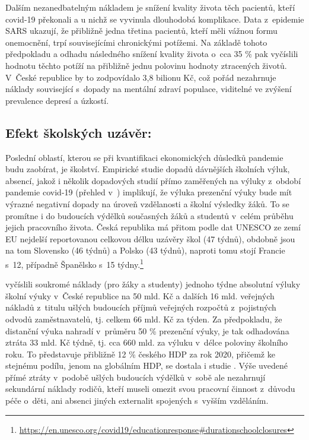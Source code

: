 Dalším nezanedbatelným nákladem je snížení kvality života těch pacientů, kteří covid-19 překonali a u nichž se vyvinula dlouhodobá komplikace. Data z~epidemie SARS ukazují, že přibližně jedna třetina pacientů, kteří měli vážnou formu onemocnění, trpí souvisejícími chronickými potížemi. Na základě tohoto předpokladu a odhadu následného snížení kvality života o~cca 35 \% pak \cite{Cutler2020} vyčíslili hodnotu těchto potíží na přibližně jednu polovinu hodnoty ztracených životů. V~České republice by to zodpovídalo 3,8 bilionu Kč, což pořád nezahrnuje náklady související s~dopady na mentální zdraví populace, viditelné ve zvýšení prevalence depresí a úzkostí.

\subsection*{Efekt \v{s}kolsk\'{y}ch uz\'{a}v\v{e}r:} 

Poslední oblastí, kterou se při kvantifikaci ekonomických důsledků pandemie budu zaobírat, je školství. Empirické studie dopadů dávnějších školních výluk, absencí, jakož i několik dopadových studií přímo zaměřených na výluky z~období pandemie covid-19 (přehled v~\cite{Jann2021}) implikují, že výluka prezenční výuky bude mít výrazné negativní dopady na úroveň vzdělanosti a školní výsledky žáků. To se promítne i do budoucích výdělků současných žáků a studentů v~celém průběhu jejich pracovního života. Česká republika má přitom podle dat UNESCO ze zemí EU nejdelší reportovanou celkovou délku uzávěry škol (47 týdnů), obdobně jsou na tom Slovensko (46 týdnů) a Polsko (43 týdnů), naproti tomu stojí Francie s~12, případně Španělsko s~15 týdny.\footnote{\url{https://en.unesco.org/covid19/educationresponse\#durationschoolclosures}}

\cite{Jann2021} vyčíslili soukromé náklady (pro žáky a studenty) jednoho týdne absolutní výluky školní výuky v~České republice na 50 mld. Kč a dalších 16 mld. veřejných nákladů z~titulu ušlých budoucích příjmů veřejných rozpočtů z~pojistných odvodů zaměstnavatelů, tj. celkem 66 mld. Kč za týden. Za předpokladu, že distanční výuka nahradí v~průměru 50 \% prezenční výuky, je tak odhadována ztráta 33 mld. Kč týdně, tj. cca 660 mld. za výluku v~délce poloviny školního roku. To představuje přibližně 12 \% českého HDP za rok 2020, přičemž ke stejnému podílu, jenom na globálním HDP, se dostala i studie \cite{Azevedo2020}. Výše uvedené přímé ztráty v~podobě ušlých budoucích výdělků v~sobě ale nezahrnují sekundární náklady rodičů, kteří museli omezit svou pracovní činnost z~důvodu péče o~děti, ani absenci jiných externalit spojených s~vyšším vzděláním.

